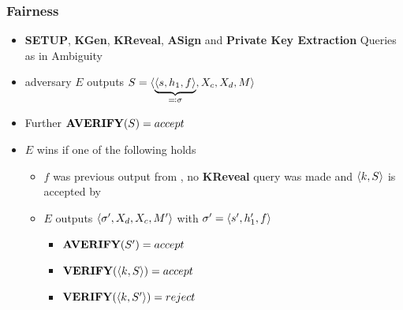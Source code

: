 \begin{frame}
	\frametitle{Fairness}

	\begin{itemize}
		\item \textbf{SETUP}, \textbf{KGen}, \textbf{KReveal}, \textbf{ASign} and \textbf{Private Key Extraction} Queries as in Ambiguity
		\item adversary $E$ outputs $S=\langle \underbrace{\langle s, h_1, f \rangle}_{\eqqcolon\sigma},X_c, X_d, M \rangle$
		\item Further $\textbf{AVERIFY}(S)=accept$
		\item $E$ wins if one of the following holds
			\begin{itemize}
				\item $f$ was previous output from \keygen, no \textbf{KReveal} query was made and $\langle k, S \rangle$ is accepted by \verify
				\item $E$ outputs $\langle \sigma',X_d, X_c, M' \rangle$ with $\sigma' = \langle s', h_1', f \rangle$ 
					\begin{itemize}
						\item $\textbf{AVERIFY}(S') = accept$
						\item $\textbf{VERIFY}(\langle k,S \rangle) = accept$
						\item $\textbf{VERIFY}(\langle k,S' \rangle) = reject$
					\end{itemize}
			\end{itemize}
	\end{itemize}
\end{frame}